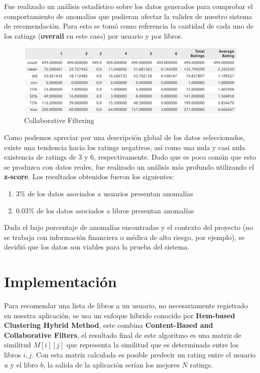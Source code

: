 \documentclass[14pt]{extarticle}
\begin{document}
Fue realizado un análisis estadístico sobre los datos generados para comprobar el comportamiento de anomalías que pudieran afectar la validez de nuestro sistema de recomendación. Para esto se tomó como referencia la cantidad de cada uno de los ratings (\textbf{overall} en este caso) por usuario y por libros.

\begin{figure}[H]
    \centering
    \includegraphics[width=\textwidth]{./images/general_stats.png}
    \caption{Collaborative Filtering}
    \label{Collaborative Filtering}
\end{figure}

Como podemos apreciar por una descripción global de los datos seleccionados, existe una tendencia hacia los ratings negativos, así como una nula y casi nula existencia de ratings de 3 y 6, respectivamente. Dado que es poco común que esto se produzca con datos reales, fue realizado un análisis más profundo utilizando el \textbf{z-score}. Los resultados obtenidos fueron los siguientes:

\begin{enumerate}
    \item $3\%$ de los datos asociados a usuarios presentan anomalías
    \item $0.03\%$ de los datos asociados a libros presentan anomalías
\end{enumerate}

Dada el bajo porcentaje de anomalías encontradas y el contexto del proyecto (no se trabaja con información financiera o médica de alto riesgo, por ejemplo), se decidió que los datos son viables para la prueba del sistema.

\section{Implementación}

Para recomendar una lista de libros a un usuario, no necesariamente registrado en nuestra aplicación, se usa un enfoque híbrido conocido por \textbf{Item-based Clustering Hybrid Method}, este combina \textbf{Content-Based and Collaborative Filters}, el resultado final de este algoritmo es una matriz de similitud $M[i][j]$ que representa la similitud que es determinada entre los libros $i, j$. Con esta matriz calculada es posible predecir un rating entre el usuario $u$ y el libro $b$, la salida de la aplicación serían los mejores $N$ ratings.   
\end{document}
